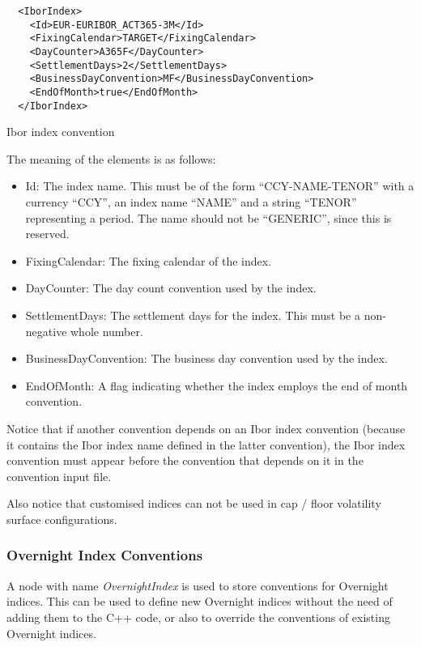 \begin{listing}[H]
\begin{verbatim}
  <IborIndex>
    <Id>EUR-EURIBOR_ACT365-3M</Id>
    <FixingCalendar>TARGET</FixingCalendar>
    <DayCounter>A365F</DayCounter>
    <SettlementDays>2</SettlementDays>
    <BusinessDayConvention>MF</BusinessDayConvention>
    <EndOfMonth>true</EndOfMonth>
  </IborIndex>
\end{verbatim}
\caption{Ibor index convention}
\label{lst:ibor_index_conventions}
\end{listing}

The meaning of the elements is as follows:

\begin{itemize}
\item Id: The index name. This must be of the form ``CCY-NAME-TENOR'' with a currency ``CCY'', an index name ``NAME''
  and a string ``TENOR'' representing a period. The name should not be ``GENERIC'', since this is reserved.
\item FixingCalendar: The fixing calendar of the index.
\item DayCounter: The day count convention used by the index.
\item SettlementDays: The settlement days for the index. This must be a non-negative whole number.
\item BusinessDayConvention: The business day convention used by the index.
\item EndOfMonth: A flag indicating whether the index employs the end of month convention.
\end{itemize}

Notice that if another convention depends on an Ibor index convention (because it contains the Ibor index name defined
in the latter convention), the Ibor index convention must appear before the convention that depends on it in the
convention input file.

Also notice that customised indices can not be used in cap / floor volatility surface configurations.

\subsubsection{Overnight Index Conventions}

A node with name \emph{OvernightIndex} is used to store conventions for Overnight indices. This can be used to define
new Overnight indices without the need of adding them to the C++ code, or also to override the conventions of existing
Overnight indices.

